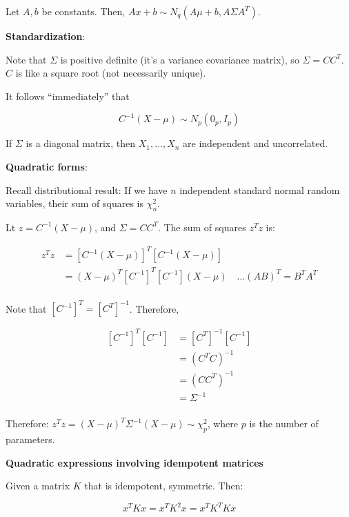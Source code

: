 Let $A, b$ be constants. Then, $Ax + b\sim N_q (A\mu + b, A\Sigma A^T)$.

\textbf{Standardization}:

Note that $\Sigma$ is positive definite (it's a variance covariance matrix), so $\Sigma = CC^T$. 
$C$ is like a square root (not necessarily unique).
 
It follows ``immediately'' that 

\begin{equation}
C^{-1} (X-\mu) \sim N_p (0_p, I_p)
\end{equation}

If $\Sigma$ is a diagonal matrix, then $X_1,\dots,X_n$ are independent and uncorrelated.

\textbf{Quadratic forms}:

Recall distributional result: If we have $n$ independent standard normal random variables, their sum of squares is $\chi_n^2$.

Lt $z = C^{-1} (X-\mu)$, and $\Sigma=CC^T$. The sum of squares $z^T z$ is:

\begin{equation}
\begin{split}
z^T z & = [C^{-1} (X-\mu)]^T [C^{-1} (X-\mu)]\\
& = (X-\mu)^T [C^{-1}]^T [C^{-1}](X-\mu) \quad \dots (AB)^T=B^T A^T\\
\end{split}
\end{equation} 

Note that $ [C^{-1}]^T =  [C^{T}]^{-1}$. Therefore, 

\begin{equation}
\begin{split}
[C^{-1}]^T [C^{-1}] & = [C^T]^{-1} [C^{-1}]\\
& = (C^T C)^{-1}\\
& = (C C^T)^{-1}\\
& = \Sigma^{-1}\\
\end{split}
\end{equation} 

Therefore: $z^T z = (X-\mu)^T  \Sigma^{-1} (X-\mu)\sim \chi_p^2$, where $p$ is the number of parameters.

\textbf{Quadratic expressions involving idempotent matrices}

Given a matrix $K$ that is idempotent, symmetric. Then:

\begin{equation}
x^T K x = x^T K^2 x = x^T K^T K x
\end{equation}

